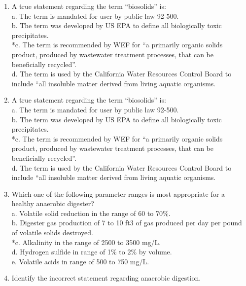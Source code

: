 \documentclass{article}
\begin{document}
\begin{enumerate}
\item  A true statement regarding the term “biosolids” is: \\

a. The term is mandated for user by public law 92-500. \\
b. The term was developed by US EPA to define all biologically toxic precipitates. \\
*c. The term is recommended by WEF for “a primarily organic solids product, produced by wastewater treatment processes, that can be beneficially recycled”. \\
d. The term is used by the California Water Resources Control Board to include “all insoluble matter derived from living aquatic organisms. \\

\item  A true statement regarding the term “biosolids” is: \\

a. The term is mandated for user by public law 92-500. \\
b. The term was developed by US EPA to define all biologically toxic precipitates. \\
*c. The term is recommended by WEF for “a primarily organic solids product, produced by wastewater treatment processes, that can be beneficially recycled”. \\
d. The term is used by the California Water Resources Control Board to include “all insoluble matter derived from living aquatic organisms. \\

\item  Which one of the following parameter ranges is most appropriate for a healthy anaerobic digester? \\

a. Volatile solid reduction in the range of 60 to 70\%. \\
b. Digester gas production of 7 to 10 ft3 of gas produced per day per pound of volatile solids destroyed. \\
*c. Alkalinity in the range of 2500 to 3500 mg/L. \\
d. Hydrogen sulfide in range of 1\% to 2\% by volume. \\
e. Volatile acids in range of 500 to 750 mg/L. \\

\item  Identify the incorrect statement regarding anaerobic digestion. \\


\end{enumerate}
\end{document}
